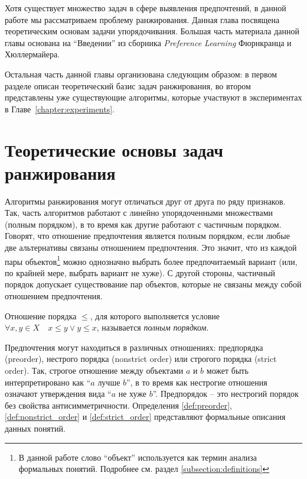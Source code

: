 Хотя существует множество задач в сфере выявления предпочтений, в данной работе мы рассматриваем проблему ранжирования. Данная глава посвящена теоретическим основам задачи упорядочивания. Большая часть материала данной главы основана на \enquote{Введении} из сборника \textit{Preference Learning} Фюрнкранца и Хюллермайера\cite{plbook:Introduction:2010}.

Остальная часть данной главы организована следующим образом: в первом разделе описан теоретический базис задач ранжирования, во втором представлены уже существующие алгоритмы, которые участвуют в экспериментах в Главе~\ref{chapter:experiments}.

\section{Теоретические основы задач ранжирования}

	Алгоритмы ранжирования могут отличаться друг от друга по ряду признаков. Так, часть алгоритмов работают с линейно упорядоченными множествами (полным порядком), в то время как другие работают с частичным порядком. Говорят, что отношение предпочтения является полным порядком, если любые две альтернативы связаны отношением предпочтения. Это значит, что из каждой пары объектов\footnote{В данной работе слово \enquote{объект} используется как термин анализа формальных понятий. Подробнее см. раздел \ref{subsection:definitions}} можно однозначно выбрать более предпочитаемый вариант (или, по крайней мере, выбрать вариант не хуже). С другой стороны, частичный порядок допускает существование пар объектов, которые не связаны между собой отношением предпочтения. 
	\begin{definition}
		\label{def:total_order}
		Отношение порядка $\leq$, для которого выполняется условие
		$\forall x,y\in X \quad  x\leq y \vee y \leq x$,
		называется \emph{полным порядком}.
	\end{definition}
	
	Предпочтения могут находиться в различных отношениях: предпорядка (preorder), нестрого порядка (nonstrict order) или строгого порядка (strict order). Так, строгое отношение между объектами $a$ и $b$ может быть интерпретировано как \enquote{$a$ лучше $b$}, в то время как нестрогие отношения означают утверждения вида \enquote{$a$ не хуже $b$}\cite[с.~384]{Barten:1982}. Предпорядок – это нестрогий порядок без свойства антисимметричности. Определения \ref{def:preorder}, \ref{def:nonstrict_order} и \ref{def:strict_order} представляют формальные описания данных понятий.
	
